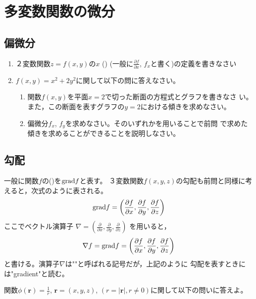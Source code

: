 \documentclass[twocolumn,11pt]{jarticle}
\begin{document}
\section{多変数関数の微分}

\subsection{偏微分}
\begin{enumerate}
\item ２変数関数$z=f(x,y)$の$x$
()
(一般に$\frac{\partial f}{\partial x}$, $f_x$と書く)の定義を書きなさい
\item $f(x,y)=x^2+2y^2$に関して以下の問に答えなさい。
  \begin{enumerate}
  \item 関数$f(x,y)$を平面$x=2$で切った断面の方程式とグラフを書きなさ
    い。また，この断面を表すグラフの$y=2$における傾きを求めなさい。
  \item 偏微分$f_x$, $f_y$を求めなさい。そのいずれかを用いることで前問
    で求めた傾きを求めることができることを説明しなさい。
  \end{enumerate}
\end{enumerate}%

\subsection{勾配}

一般に関数$f$の()を$\mbox{grad} f$と表す。
３変数関数$f(x,y,z)$の勾配も前問と同様に考えると，次式のように表される。
\begin{align}
\mbox{grad} f=\left(\frac{\partial f}{\partial x},\frac{\partial f}{\partial
  y},\frac{\partial f}{\partial z}\right)\notag
\end{align}
ここでベクトル演算子
$\nabla=\left(\frac{\partial}{\partial x},\frac{\partial}{\partial
  y},\frac{\partial}{\partial z}\right)$
を用いると，
\begin{align}
\nabla f=\mbox{grad} f
=\left(\frac{\partial f}{\partial x},\frac{\partial f}{\partial
  y},\frac{\partial f}{\partial z}\right)\notag
\end{align}
と書ける。演算子$\nabla$は""と呼ばれる記号だが，上記のように
勾配を表すときには"gradient"と読む。

関数$\displaystyle\phi(\boldsymbol{r})=\frac{1}{r}$, $\boldsymbol{r}=(x,y,z)$, 
$(r=|\boldsymbol{r}|, r\ne0)$に関して以下の問いに答えよ。
\end{document}
